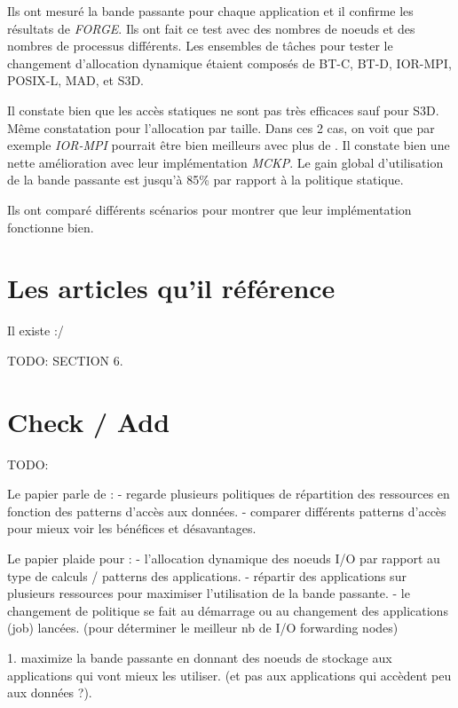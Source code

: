 \documentclass[10pt, a4paper]{article}
\begin{document}
Ils ont mesuré la bande passante pour chaque application et il confirme les résultats de \emph{FORGE}. Ils ont fait ce test avec des nombres de noeuds et des nombres de processus différents.
Les ensembles de tâches pour tester le changement d'allocation dynamique étaient composés de BT-C, BT-D, IOR-MPI, POSIX-L, MAD, et S3D.

Il constate bien que les accès statiques ne sont pas très efficaces sauf pour S3D. Même constatation pour l'allocation par taille. Dans ces 2 cas, on voit que par exemple \emph{IOR-MPI} pourrait être bien meilleurs avec plus de \noeudsIOforwarding{}. Il constate bien une nette amélioration avec leur implémentation \emph{MCKP}. Le gain global d'utilisation de la bande passante est jusqu'à 85\% par rapport à la politique statique.

Ils ont comparé différents scénarios pour montrer que leur implémentation fonctionne bien.

\section{Les articles qu'il référence}

Il existe :/

TODO: SECTION 6.

\section{Check / Add}

TODO:

Le papier parle de :
- regarde plusieurs politiques de répartition des ressources en fonction des patterns d'accès aux données.
- comparer différents patterns d'accès pour mieux voir les bénéfices et désavantages.

Le papier plaide pour :
- l'allocation dynamique des noeuds I/O par rapport au type de calculs / patterns des applications.
- répartir des applications sur plusieurs ressources pour maximiser l'utilisation de la bande passante.
- le changement de politique se fait au démarrage ou au changement des applications (job) lancées. (pour déterminer le meilleur nb de I/O forwarding nodes)

1. maximize la bande passante en donnant des noeuds de stockage aux applications qui vont mieux les utiliser. (et pas aux applications qui accèdent peu aux données ?).


\nocite{*}
\end{document}
